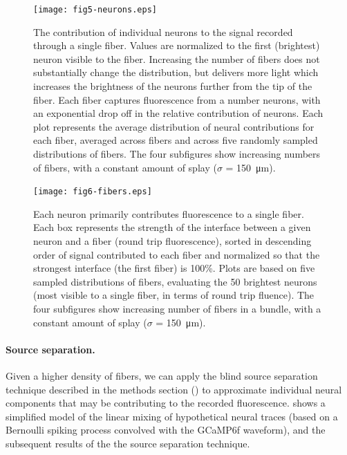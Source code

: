 \begin{figure}
\texttt{[image: fig5-neurons.eps]}
\caption[Contribution of neurons to fiber in descending order]{The contribution of individual neurons to the signal recorded through a single fiber. Values are normalized to the first (brightest) neuron visible to the fiber. Increasing the number of fibers does not substantially change the distribution, but delivers more light which increases the brightness of the neurons further from the tip of the fiber. Each fiber captures fluorescence from a number neurons, with an exponential drop off in the relative contribution of neurons. Each plot represents the average distribution of neural contributions for each fiber, averaged across fibers and across five randomly sampled distributions of fibers. The four subfigures show increasing numbers of fibers, with a constant amount of splay ($\sigma$ = 150~\si{\micro\meter}).}
\label{fig:neurons}
\end{figure}

\begin{figure}
\texttt{[image: fig6-fibers.eps]}
\caption[Contribution of neuron to fibers in descending order]{Each neuron primarily contributes fluorescence to a single fiber. Each box represents the strength of the interface between a given neuron and a fiber (round trip fluorescence), sorted in descending order of signal contributed to each fiber and normalized so that the strongest interface (the first fiber) is 100\%. Plots are based on five sampled distributions of fibers, evaluating the 50 brightest neurons (most visible to a single fiber, in terms of round trip fluence). The four subfigures show increasing number of fibers in a bundle, with a constant amount of splay ($\sigma$ = 150~\si{\micro\meter}).}
\label{fig:fibers}
\end{figure}

\paragraph{Source separation.} Given a higher density of fibers, we can apply the blind source separation technique described in the methods section () to approximate individual neural components that may be contributing to the recorded fluorescence.  shows a simplified model of the linear mixing of hypothetical neural traces (based on a Bernoulli spiking process convolved with the GCaMP6f waveform), and the subsequent results of the the source separation technique.

